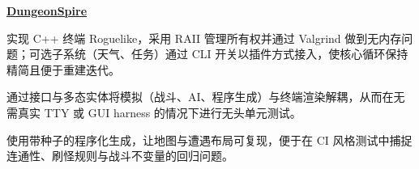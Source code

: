 \begin{twocolentry}{}
\href{https://github.com/faketut/DungeonSpire}{\textbf{DungeonSpire}}
\end{twocolentry}
\begin{onecolentry}
\begin{highlights}
\item 实现 C++ 终端 Roguelike，采用 RAII 管理所有权并通过 Valgrind 做到无内存问题；可选子系统（天气、任务）通过 CLI 开关以插件方式接入，使核心循环保持精简且便于重建迭代。
\item 通过接口与多态实体将模拟（战斗、AI、程序生成）与终端渲染解耦，从而在无需真实 TTY 或 GUI harness 的情况下进行无头单元测试。
\item 使用带种子的程序化生成，让地图与遭遇布局可复现，便于在 CI 风格测试中捕捉连通性、刷怪规则与战斗不变量的回归问题。
\end{highlights}
\end{onecolentry}

